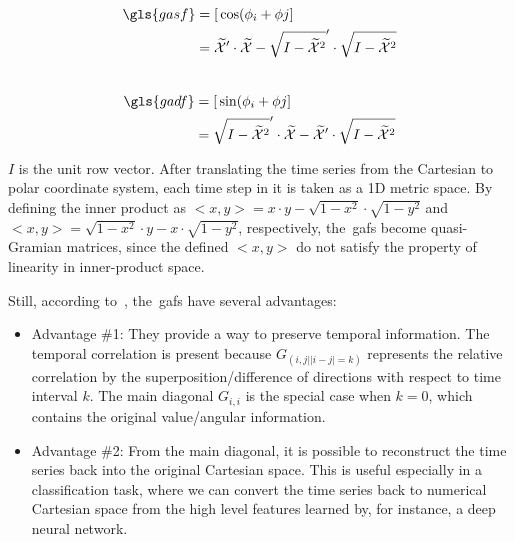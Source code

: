 \begin{equation}
\begin{aligned}
\gls{gasf} &= [\,\cos(\phi_{i} + \phi{j}]\, \\
	 &= \widetilde{\mathcal{X}}' \cdot \widetilde{\mathcal{X}} - \sqrt{I-\widetilde{\mathcal{X}}^2}' \cdot \sqrt{I-\widetilde{\mathcal{X}}^2}
\end{aligned}
\end{equation}
\\
\begin{equation}
\begin{aligned}
\gls{gadf} &= [\,\sin(\phi_{i} + \phi{j}]\, \\
	 &= \sqrt{I-\widetilde{\mathcal{X}}^2}' \cdot \widetilde{\mathcal{X}} - \widetilde{\mathcal{X}}' \cdot \sqrt{I-\widetilde{\mathcal{X}}^2}\\
\end{aligned}
\end{equation}

$I$ is the unit row vector. After translating the time series from the Cartesian to polar coordinate system, each time step in it is taken as a 1D metric space. By defining the inner product as $<x,y> = x \cdot y - \sqrt{1-x^2} \cdot \sqrt{1-y^2}$ and $<x,y> = \sqrt{1-x^2} \cdot y - x \cdot \sqrt{1-y^2}$,
respectively, the~\gls{gaf}s become {quasi-Gramian} matrices, since the defined $<x,y>$ do not satisfy the property of linearity in inner-product space.

Still, according to~\cite{wang_imaging_2015}, the~\gls{gaf}s have several advantages:

\begin{itemize}[leftmargin=*,labelsep=5.8mm]
\item {Advantage \#1}: They provide a way to preserve temporal information. The temporal correlation is present because $G_{(i,j||i-j|=k)}$ represents the relative correlation by the superposition/difference of directions with respect to time interval $k$. The main diagonal $G_{i,i}$ is the special case when $k = 0$, which contains the original value/angular information. 
\item {Advantage \#2:} From the main diagonal, it is possible to reconstruct the time series back into the original Cartesian space. This is useful especially in a classification task, where we can convert the time series back to numerical Cartesian space from the high level features learned by, for instance, a deep neural network.
\end{itemize}


